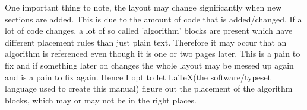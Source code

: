 \documentclass{article}
\begin{document}
One important thing to note, the layout may change significantly when new sections are added. This is due to the amount of code that is added/changed. If a lot of code changes, a lot of so called
'algorithm' blocks are present which have different placement rules than just plain text. Therefore it may occur that an algorithm is referenced even though it is one or two pages later. This is 
a pain to fix and if something later on changes the whole layout may be messed up again and is a pain to fix again. Hence I opt to let \LaTeX (the software/typeset language used to create this 
manual) figure out the placement of the algorithm blocks, which may or may not be in the right places.

















\newpage


\newpage


\end{document}

